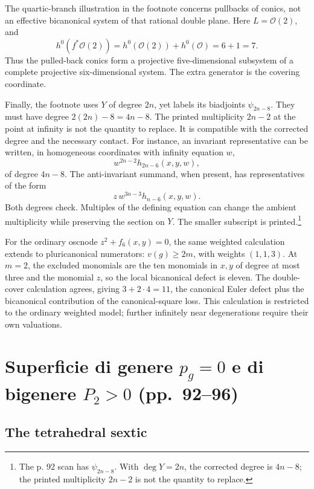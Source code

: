 The quartic-branch illustration in the footnote concerns pullbacks of conics, not an effective bicanonical system of that rational double plane. Here \(L=\mathcal O(2)\), and \[
h^0(f^*\mathcal O(2))=h^0(\mathcal O(2))+h^0(\mathcal O)=6+1=7.
\] Thus the pulled-back conics form a projective five-dimensional subsystem of a complete projective six-dimensional system. The extra generator is the covering coordinate.

Finally, the footnote uses \(Y\) of degree \(2n\), yet labels its biadjoints \(\psi_{2n-8}\). They must have degree \(2(2n)-8=4n-8\). The printed multiplicity \(2n-2\) at the point at infinity is not the quantity to replace. It is compatible with the corrected degree and the necessary contact. For instance, an invariant representative can be written, in homogeneous coordinates with infinity equation \(w\), \[
w^{2n-2}h_{2n-6}(x,y,w),
\] of degree \(4n-8\). The anti-invariant summand, when present, has representatives of the form \[
z\,w^{3n-3}h_{n-6}(x,y,w).
\] Both degrees check. Multiples of the defining equation can change the ambient multiplicity while preserving the section on \(Y\). The smaller subscript is printed.\footnote{The p. 92 scan has \(\psi_{2n-8}\). With \(\deg Y=2n\), the corrected degree is \(4n-8\); the printed multiplicity \(2n-2\) is not the quantity to replace.}

For the ordinary oscnode \(z^2+f_6(x,y)=0\), the same weighted calculation extends to pluricanonical numerators: \(v(g)\ge2m\), with weights \((1,1,3)\). At \(m=2\), the excluded monomials are the ten monomials in \(x,y\) of degree at most three and the monomial \(z\), so the local bicanonical defect is eleven. The double-cover calculation agrees, giving \(3+2\cdot4=11\), the canonical Euler defect plus the bicanonical contribution of the canonical-square loss. This calculation is restricted to the ordinary weighted model; further infinitely near degenerations require their own valuations.

\section[Genere zero e bigenere positivo]{\texorpdfstring{Superficie di genere \(p_g=0\) e di bigenere \(P_2>0\) (pp.~92--96)}{Superficie di genere p\_g=0 e di bigenere P\_2\textgreater0 (pp.~92--96)}}\label{commentary-III-12}

\subsection{The tetrahedral sextic}

